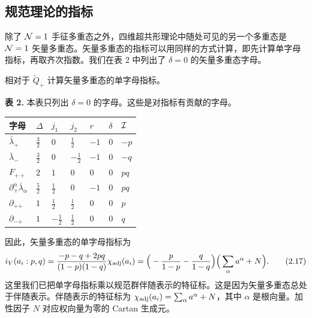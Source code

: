 \subsection{规范理论的指标}

除了 $\mathcal{N}=1$ 手征多重态之外，四维超共形理论中随处可见的另一个多重态是 $\mathcal{N}=1$ 矢量多重态。矢量多重态的指标可以用同样的方式计算，即先计算单字母指标，再取齐次指数。我们在表 2 中列出了 $\delta=0$ 的矢量多重态字母。
\begin{exercise}[2.2]
相对于 $\tilde Q_{\dot+}$ 计算矢量多重态的单字母指标。
\end{exercise}
\noindent\textbf{表 2.} 本表只列出 $\delta=0$ 的字母。这些是对指标有贡献的字母。

\begin{center}
\begin{tabular}{C{4.6em} C{1.4em} C{1.4em} C{1.4em} C{1.4em} C{1.4em} C{2.2em}}
\toprule
字母 & $\Delta$ & $j_1$ & $j_2$ & $r$ & $\delta$ & $\mathcal{I}$ \\
\midrule
$\bar\lambda_{\dot+}$ & $\frac32$ & $0$ & $\frac12$ & $-1$ & $0$ & $-p$ \\
$\bar\lambda_{\dot-}$ & $\frac32$ & $0$ & $-\frac12$ & $-1$ & $0$ & $-q$ \\
$F_{++}$ & $2$ & $1$ & $0$ & $0$ & $0$ & $pq$ \\
$\partial^{\dot\alpha}_{+}\bar\lambda_{\dot\alpha}$ & $\frac52$ & $\frac12$ & $0$ & $-1$ & $0$ & $pq$ \\
$\partial_{+\dot+}$ & $1$ & $\frac12$ & $\frac12$ & $0$ & $0$ & $p$ \\
$\partial_{-\dot+}$ & $1$ & $-\frac12$ & $\frac12$ & $0$ & $0$ & $q$ \\
\bottomrule
\end{tabular}
\end{center}

因此，矢量多重态的单字母指标为
\[
i_V(a_i:p,q)=\frac{-p-q+2pq}{(1-p)(1-q)}\chi_{\operatorname{adj}}(a_i)
=\Big(-\frac{p}{1-p}-\frac{q}{1-q}\Big)\Big(\sum_\alpha a^\alpha+N\Big) .
\tag{2.17}
\]
这里我们已把单字母指标乘以规范群伴随表示的特征标。这是因为矢量多重态总处于伴随表示。伴随表示的特征标为 $\chi_{\operatorname{adj}}(a_i)=\sum_\alpha a^\alpha+N$，其中 $\alpha$ 是根向量。加性因子 $N$ 对应权向量为零的 Cartan 生成元。

